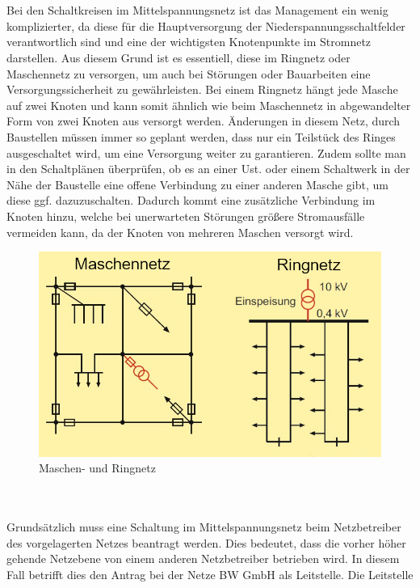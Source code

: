 \\\\
Bei den Schaltkreisen im Mittelspannungsnetz ist das Management ein wenig komplizierter, da diese für die Hauptversorgung der Niederspannungsschaltfelder 
verantwortlich sind und eine der wichtigsten Knotenpunkte im Stromnetz darstellen. Aus diesem Grund ist es essentiell, diese im Ringnetz oder Maschennetz 
zu versorgen, um auch bei Störungen oder Bauarbeiten eine Versorgungssicherheit zu gewährleisten. Bei einem Ringnetz hängt jede Masche auf zwei Knoten und 
kann somit ähnlich wie beim Maschennetz  in abgewandelter Form von zwei Knoten aus versorgt werden. Änderungen in diesem Netz, \zB durch Baustellen müssen 
immer so geplant werden, dass nur ein Teilstück des Ringes ausgeschaltet wird, um eine Versorgung weiter zu garantieren. Zudem sollte man in den Schaltplänen 
überprüfen, ob es an einer Ust. oder einem Schaltwerk in der Nähe der Baustelle eine offene Verbindung zu einer anderen Masche gibt, um diese ggf. 
dazuzuschalten. Dadurch kommt eine zusätzliche Verbindung im Knoten hinzu, welche bei unerwarteten Störungen größere Stromausfälle vermeiden kann, da der 
Knoten von mehreren Maschen versorgt wird. \autocite{Schwab.2012}
\begin{figure}[hbt]
    \centering
    \includegraphics[width=0.98\linewidth]{images/Ring und Maschennetz}
    \caption[Maschen/Ringnetz]{Maschen- und Ringnetz \autocite{Schwab.2012}}
    \label{fig:Maschen/Ringnetz}
\end{figure}
\\\\
Grundsätzlich muss eine Schaltung im Mittelspannungsnetz beim Netzbetreiber des vorgelagerten Netzes  beantragt werden. Dies bedeutet, dass die vorher höher 
gehende Netzebene von einem anderen Netzbetreiber betrieben wird. In diesem Fall betrifft dies den Antrag bei der Netze BW GmbH als Leitstelle. Die Leitstelle 
